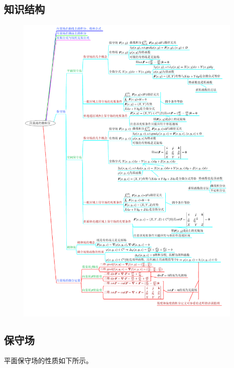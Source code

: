 \documentclass[12pt,UTF8,fleqn]{ctexart}
\begin{document}
\subsection{知识结构}
\begin{figure}[H]
\begin{center}
\includegraphics[height=1\textheight]{20190614.pdf}
\end{center}
\end{figure}
\subsection{保守场}

平面保守场的性质如下所示。
\end{document}
